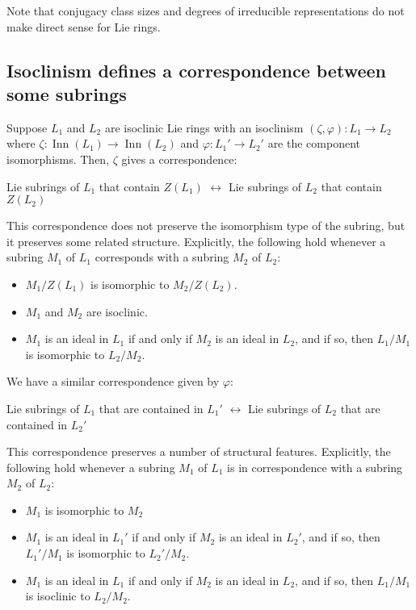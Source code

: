 \documentclass{ucetd}
\begin{document}
Note that conjugacy class sizes and degrees of irreducible
representations do not make direct sense for Lie rings. %

\subsection{Isoclinism defines a correspondence between some subrings}

Suppose $L_1$ and $L_2$ are isoclinic Lie rings with an isoclinism
$(\zeta,\varphi): L_1 \to L_2$ where $\zeta:\operatorname{Inn}(L_1)
\to \operatorname{Inn}(L_2)$ and $\varphi:L_1' \to L_2'$ are the
component isomorphisms. Then, $\zeta$ gives a correspondence:

Lie subrings of $L_1$ that contain $Z(L_1)$ $\leftrightarrow$
Lie subrings of $L_2$ that contain $Z(L_2)$

This correspondence does not preserve the isomorphism type of the
subring, but it preserves some related structure. Explicitly, the
following hold whenever a subring $M_1$ of $L_1$ corresponds with a
subring $M_2$ of $L_2$:

\begin{itemize}
\item $M_1/Z(L_1)$ is isomorphic to $M_2/Z(L_2)$.
\item $M_1$ and $M_2$ are isoclinic.
\item $M_1$ is an ideal in $L_1$ if and only if $M_2$ is an ideal in
  $L_2$, and if so, then $L_1/M_1$ is isomorphic to $L_2/M_2$.
\end{itemize}

We have a similar correspondence given by $\varphi$:

Lie subrings of $L_1$ that are contained in $L_1'$ $\leftrightarrow$
Lie subrings of $L_2$ that are contained in $L_2'$

This correspondence preserves a number of structural
features. Explicitly, the following hold whenever a subring $M_1$ of
$L_1$ is in correspondence with a subring $M_2$ of $L_2$:

\begin{itemize}
\item $M_1$ is isomorphic to $M_2$
\item $M_1$ is an ideal in $L_1'$ if and only if $M_2$ is an ideal in
  $L_2'$, and if so, then $L_1'/M_1$ is isomorphic to $L_2'/M_2$.
\item $M_1$ is an ideal in $L_1$ if and only if $M_2$ is an ideal in
  $L_2$, and if so, then $L_1/M_1$ is isoclinic to $L_2/M_2$.
\end{itemize}
\end{document}
